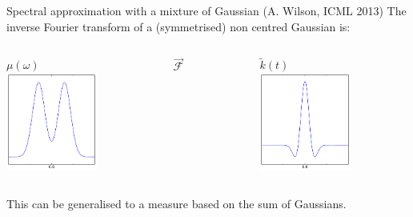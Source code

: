 \documentclass{beamer}
\begin{document}
\begin{frame}{Spectral approximation with a mixture of Gaussian (A. Wilson, ICML 2013)}
The inverse Fourier transform of a (symmetrised) non centred Gaussian is:
\begin{columns}[c]
\begin{column}{5cm}
\begin{center}
$\mu(\omega)$ \\
\includegraphics[width=3cm]{figures/python/Bochner-wilsonmu}
\end{center}
\end{column}
\begin{column}{2cm}
\begin{center}
$\stackrel{\longrightarrow}{\mathcal{F}}$
\end{center}
\end{column}
\begin{column}{5cm}
\begin{center}
$\tilde{k}(t)$\\
\includegraphics[width=3cm]{figures/python/Bochner-wilsonk}
\end{center}
\end{column}
\end{columns}
\vspace{3mm}
This can be generalised to a measure based on the sum of Gaussians.

\end{frame}
\end{document}
